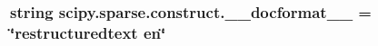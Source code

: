 \subsubsection[{\+\_\+\+\_\+docformat\+\_\+\+\_\+}]{\setlength{\rightskip}{0pt plus 5cm}string scipy.\+sparse.\+construct.\+\_\+\+\_\+docformat\+\_\+\+\_\+ = \char`\"{}restructuredtext en\char`\"{}}\label{namespacescipy_1_1sparse_1_1construct_a20c15c943f1e2d41939fde1d20c6f91c}
